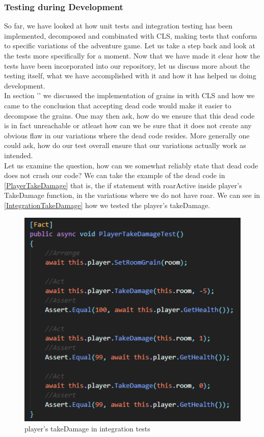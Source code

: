 \subsubsection{Testing during Development}
So far, we have looked at how unit tests and integration testing has been implemented, decomposed and combinated with CLS, making tests that conform to specific variations of the adventure game. Let us take a step back and look at the tests more specifically for a moment. Now that we have made it clear how the tests have been incorporated into our repository, let us discuss more about the testing itself, what we have accomplished with it and how it has helped us doing development. \\
In section '' we discussed the implementation of grains in with CLS and how we came to the conclusion that accepting dead code would make it easier to decompose the grains. One may then ask, how do we ensure that this dead code is in fact unreachable or atleast how can we be sure that it does not create any obvious flaw in our variations where the dead code resides. More generally one could ask, how do our test overall ensure that our variations actually work as intended. \\ 
Let us examine the question, how can we somewhat reliably state that dead code does not crash our code? We can take the example of the dead code in \autoref{PlayerTakeDamage} that is, the if statement with roarActive inside player's TakeDamage function, in the variations where we do not have roar. We can see in \autoref{IntegrationTakeDamage} how we tested the player's takeDamage.
\begin{figure}[]
    \centering
    \includegraphics[width=0.6\linewidth]{Materials/TestingDiscussion/IntegrationTakeDamage}
    \caption{player's takeDamage in integration tests}
    \label{IntegrationTakeDamage}
\end{figure} 
